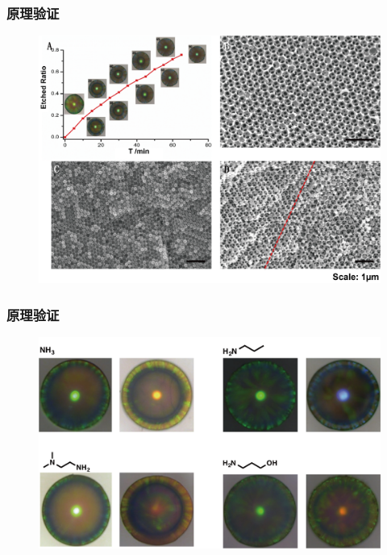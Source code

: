 \documentclass{beamer}
\begin{document}
\begin{frame}
  \frametitle{原理验证}
  \begin{figure}
    \begin{center}
      \includegraphics[width=0.85\linewidth]{figures/ch3/Etch-chara.png}
    \end{center}
  \end{figure}
\end{frame}

\begin{frame}
  \frametitle{原理验证}
  \begin{figure}
    \begin{center}
      \includegraphics[width=0.9\linewidth]{figures/ch3/CCB-Amine-reaction.png}
    \end{center}
  \end{figure}
\end{frame}
\end{document}
